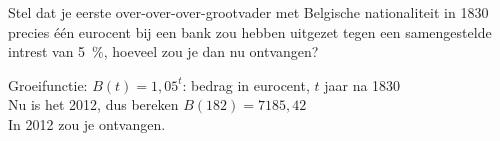 \begin{oef}
Stel dat je eerste over-over-over-grootvader met Belgische nationaliteit in 1830 precies \'e\'en eurocent bij een
bank zou hebben uitgezet tegen een samengestelde intrest van \SI{5}{\percent}, hoeveel zou je dan nu ontvangen?
\begin{opl}
Groeifunctie: $B(t)=1,05^t$: bedrag in eurocent, $t$ jaar na 1830\\
Nu is het 2012, dus bereken $B(182)=7185,42$\\
In 2012 zou je  ontvangen.
\end{opl}  
\end{oef}


